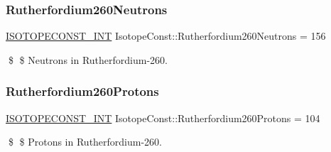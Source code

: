 \subsubsection{\texorpdfstring{Rutherfordium260\+Neutrons}{Rutherfordium260Neutrons}}
{\footnotesize\ttfamily \mbox{\hyperlink{group___isotope_const-_macros_ga5f18360b3e99483a35c32d789e62621c}{I\+S\+O\+T\+O\+P\+E\+C\+O\+N\+S\+T\+\_\+\+I\+NT}} Isotope\+Const\+::\+Rutherfordium260\+Neutrons = 156}

\$ \$ Neutrons in Rutherfordium-\/260. \mbox{\label{group___isotope_const-_rutherfordium-_rf260_gaec70677eeeabb22951cc3b10d4650ad6}} 
\subsubsection{\texorpdfstring{Rutherfordium260\+Protons}{Rutherfordium260Protons}}
{\footnotesize\ttfamily \mbox{\hyperlink{group___isotope_const-_macros_ga5f18360b3e99483a35c32d789e62621c}{I\+S\+O\+T\+O\+P\+E\+C\+O\+N\+S\+T\+\_\+\+I\+NT}} Isotope\+Const\+::\+Rutherfordium260\+Protons = 104}

\$ \$ Protons in Rutherfordium-\/260. 